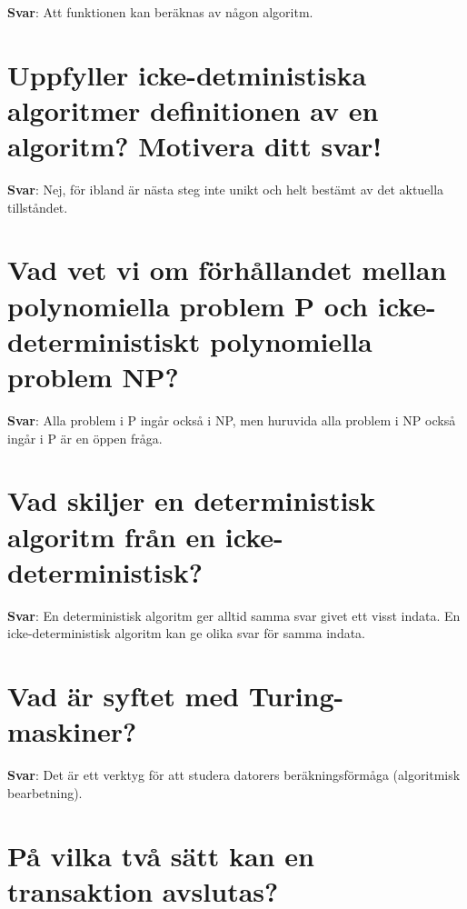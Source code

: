 \documentclass[a4paper,11pt,oneside]{book}
\begin{document}
\begin{sloppypar}
\label{q:341:sa:sv:True}

\textbf{Svar}: Att funktionen kan ber\"aknas av n\r{a}gon algoritm.



\section{Uppfyller icke-detministiska algoritmer definitionen av en algoritm? Motivera ditt svar!}

\label{q:342:sa:sv:True}

\textbf{Svar}: Nej, f\"or ibland \"ar n\"asta steg inte unikt och helt best\"amt av det aktuella tillst\r{a}ndet.



\section{Vad vet vi om f\"orh\r{a}llandet mellan polynomiella problem P och icke-deterministiskt polynomiella problem NP?}

\label{q:343:sa:sv:True}

\textbf{Svar}: Alla problem i P ing\r{a}r ocks\r{a} i NP, men huruvida alla problem i NP ocks\r{a} ing\r{a}r i P \"ar en \"oppen fr\r{a}ga.



\section{Vad skiljer en deterministisk algoritm fr\r{a}n en icke-deterministisk?}

\label{q:344:sa:sv:True}

\textbf{Svar}: En deterministisk algoritm ger alltid samma svar givet ett visst indata. En icke-deterministisk algoritm kan ge olika svar f\"or samma indata.



\section{Vad \"ar syftet med Turing-maskiner?}

\label{q:345:sa:sv:True}

\textbf{Svar}: Det \"ar ett verktyg f\"or att studera datorers ber\"akningsf\"orm\r{a}ga (algoritmisk bearbetning).



\section{P\r{a} vilka tv\r{a} s\"att kan en transaktion avslutas?}


\end{sloppypar}
\end{document}
